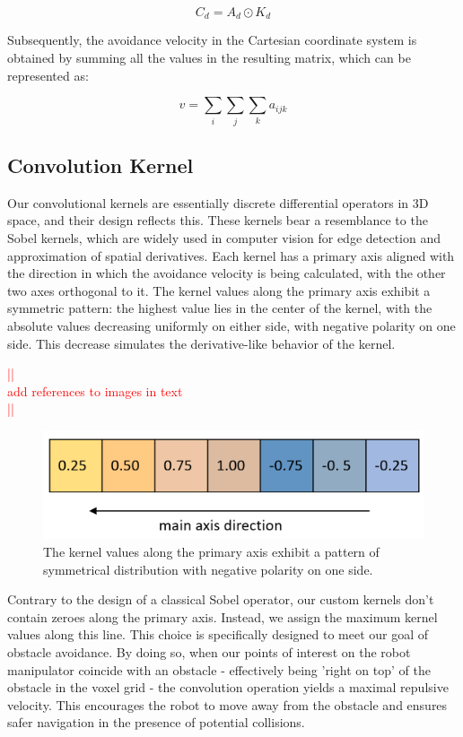 \documentclass[a4paper]{article}
\newcommand\todocomment[1]{\textcolor{red}{||\\ #1\\||}}
\begin{document}
\begin{equation}
	C_d = A_d \odot K_d
	\label{eq:hadamard}
\end{equation}

Subsequently, the avoidance velocity in the Cartesian coordinate system is obtained by summing all the values in the resulting matrix, which can be represented as:

\begin{equation}
v = \sum_{i}\sum_{j}\sum_{k} a_{ijk} 
\label{summation}
\end{equation}





\subsection{Convolution Kernel}

Our convolutional kernels are essentially discrete differential operators in 3D space, and their design reflects this. These kernels bear a resemblance to the Sobel kernels, which are widely used in computer vision for edge detection and approximation of spatial derivatives. Each kernel has a primary axis aligned with the direction in which the avoidance velocity is being calculated, with the other two axes orthogonal to it. The kernel values along the primary axis exhibit a symmetric pattern: the highest value lies in the center of the kernel, with the absolute values decreasing uniformly on either side, with negative polarity on one side. This decrease simulates the derivative-like behavior of the kernel.

\todocomment{add references to images in text}

\begin{figure}[H]
	\centering
	\includegraphics[width=0.8\linewidth]{kernel-mainvalues-colored.png}
	\caption{The kernel values along the primary axis exhibit a pattern of symmetrical distribution with negative polarity on one side.} 
	\label{Kernel main axis}
\end{figure}

Contrary to the design of a classical Sobel operator, our custom kernels don't contain zeroes along the primary axis. Instead, we assign the maximum kernel values along this line. This choice is specifically designed to meet our goal of obstacle avoidance. By doing so, when our points of interest on the robot manipulator coincide with an obstacle - effectively being 'right on top' of the obstacle in the voxel grid - the convolution operation yields a maximal repulsive velocity. This encourages the robot to move away from the obstacle and ensures safer navigation in the presence of potential collisions.
\end{document}
